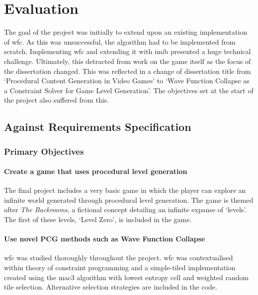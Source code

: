 \chapter{Evaluation}
The goal of the project was initially to extend upon an existing implementation of \acrshort{wfc}. As this was unsuccessful, the algorithm had to be implemented from scratch. Implementing \acrlong{wfc} and extending it with \acrlong{imib} presented a huge technical challenge. Ultimately, this detracted from work on the game itself as the focus of the dissertation changed. This was reflected in a change of dissertation title from `Procedural Content Generation in Video Games' to `Wave Function Collapse as a Constraint Solver for Game Level Generation'. The objectives set at the start of the project also suffered from this.

\section{Against Requirements Specification}
\subsection{Primary Objectives}
\subsubsection{Create a game that uses procedural level generation}
The final project includes a very basic game in which the player can explore an infinite world generated through procedural level generation. The game is themed after \textit{The Backrooms}, a fictional concept detailing an infinite expanse of `levels'. The first of these levels, `Level Zero', is included in the game.

\subsubsection{Use novel PCG methods such as Wave Function Collapse}
\acrlong{wfc} was studied thoroughly throughout the project. \acrshort{wfc} was contextualised within theory of constraint programming and a simple-tiled implementation created using the \acrshort{mac3} algorithm with lowest entropy cell and weighted random tile selection. Alternative selection strategies are included in the code.


